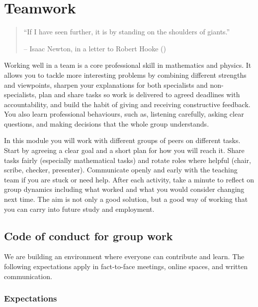 \documentclass[
  a4paper,
  DIV=11,
  numbers=noendperiod,
  oneside]{scrreprt}
\begin{document}
\chapter{Teamwork}\label{sec-teamwork}

\begin{quote}
``If I have seen further, it is by standing on the shoulders of
giants.''

-- Isaac Newton, in a letter to Robert Hooke
()
\end{quote}

Working well in a team is a core professional skill in mathematics and
physics. It allows you to tackle more interesting problems by combining
different strengths and viewpoints, sharpen your explanations for both
specialists and non-specialists, plan and share tasks so work is
delivered to agreed deadlines with accountability, and build the habit
of giving and receiving constructive feedback. You also learn
professional behaviours, such as, listening carefully, asking clear
questions, and making decisions that the whole group understands.

In this module you will work with different groups of peers on different
tasks. Start by agreeing a clear goal and a short plan for how you will
reach it. Share tasks fairly (especially mathematical tasks) and rotate
roles where helpful (chair, scribe, checker, presenter). Communicate
openly and early with the teaching team if you are stuck or need help.
After each activity, take a minute to reflect on group dynamics
including what worked and what you would consider changing next time.
The aim is not only a good solution, but a good way of working that you
can carry into future study and employment.

\section{Code of conduct for group work}\label{sec-teamwork-code}

We are building an environment where everyone can contribute and learn.
The following expectations apply in fact-to-face meetings, online
spaces, and written communication.

\subsection*{Expectations}\label{expectations}
\end{document}

